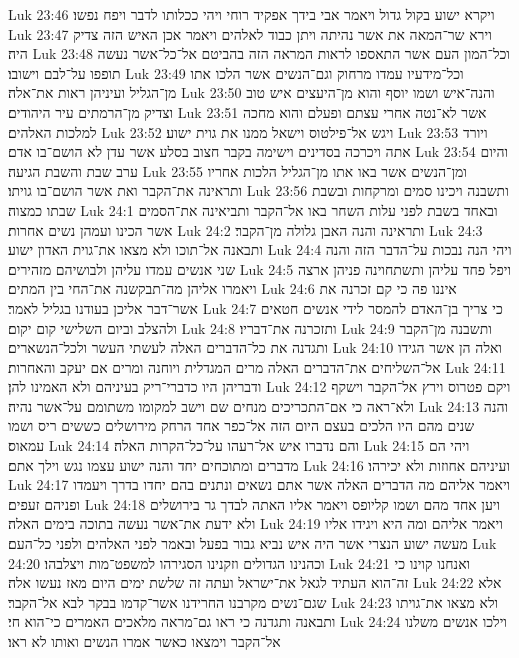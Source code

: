 Luk 23:46  ויקרא ישוע בקול גדול ויאמר אבי בידך אפקיד רוחי ויהי ככלותו לדבר ויפח נפשו׃
Luk 23:47  וירא שר־המאה את אשר נהיתה ויתן כבוד לאלהים ויאמר אכן האיש הזה צדיק היה׃
Luk 23:48  וכל־המון העם אשר התאספו לראות המראה הזה בהביטם אל־כל־אשר נעשה תופפו על־לבם וישובו׃
Luk 23:49  וכל־מידעיו עמדו מרחוק וגם־הנשים אשר הלכו אתו מן־הגליל ועיניהן ראות את־אלה׃
Luk 23:50  והנה־איש ושמו יוסף והוא מן־היעצים איש טוב וצדיק מן־הרמתים עיר היהודים׃
Luk 23:51  אשר לא־נטה אחרי עצתם ופעלם והוא מחכה למלכות האלהים׃
Luk 23:52  ויגש אל־פילטוס וישאל ממנו את גוית ישוע׃
Luk 23:53  ויורד אתה ויכרכה בסדינים וישימה בקבר חצוב בסלע אשר עדן לא הושם־בו אדם׃
Luk 23:54  והיום ערב שבת והשבת הגיעה׃
Luk 23:55  ומן־הנשים אשר באו אתו מן־הגליל הלכות אחריו ותראינה את־הקבר ואת אשר הושם־בו גויתו׃
Luk 23:56  ותשבנה ויכינו סמים ומרקחות ובשבת שבתו כמצוה׃
Luk 24:1  ובאחד בשבת לפני עלות השחר באו אל־הקבר ותביאינה את־הסמים אשר הכינו ועמהן נשים אחרות׃
Luk 24:2  ותראינה והנה האבן גלולה מן־הקבר׃
Luk 24:3  ותבאנה אל־תוכו ולא מצאו את־גוית האדון ישוע׃
Luk 24:4  ויהי הנה נבכות על־הדבר הזה והנה שני אנשים עמדו עליהן ולבושיהם מזהירים׃
Luk 24:5  ויפל פחד עליהן ותשתחוינה פניהן ארצה ויאמרו אליהן מה־תבקשנה את־החי בין המתים׃
Luk 24:6  איננו פה כי קם זכרנה את אשר־דבר אליכן בעודנו בגליל לאמר׃
Luk 24:7  כי צריך בן־האדם להמסר לידי אנשים חטאים ולהצלב וביום השלישי קום יקום׃
Luk 24:8  ותזכרנה את־דבריו׃
Luk 24:9  ותשבנה מן־הקבר ותגדנה את כל־הדברים האלה לעשתי העשר ולכל־הנשארים׃
Luk 24:10  ואלה הן אשר הגידו אל־השליחים את־הדברים האלה מרים המגדלית ויוחנה ומרים אם יעקב והאחרות׃
Luk 24:11  ודבריהן היו כדברי־ריק בעיניהם ולא האמינו להן׃
Luk 24:12  ויקם פטרוס וירץ אל־הקבר וישקף ולא־ראה כי אם־התכריכים מנחים שם וישב למקומו משתומם על־אשר נהיה׃
Luk 24:13  והנה שנים מהם היו הלכים בעצם היום הזה אל־כפר אחד הרחק מירושלים כששים ריס ושמו עמאוס׃
Luk 24:14  והם נדברו איש אל־רעהו על־כל־הקרות האלה׃
Luk 24:15  ויהי הם מדברים ומתוכחים יחד והנה ישוע עצמו נגש וילך אתם׃
Luk 24:16  ועיניהם אחוזות ולא יכירהו׃
Luk 24:17  ויאמר אליהם מה הדברים האלה אשר אתם נשאים ונתנים בהם יחדו בדרך ויעמדו ופניהם זעפים׃
Luk 24:18  ויען אחד מהם ושמו קליופס ויאמר אליו האתה לבדך גר בירושלים ולא ידעת את־אשר נעשה בתוכה בימים האלה׃
Luk 24:19  ויאמר אליהם ומה היא ויגידו אליו מעשה ישוע הנצרי אשר היה איש נביא גבור בפעל ובאמר לפני האלהים ולפני כל־העם׃
Luk 24:20  וכהנינו הגדולים וזקנינו הסגירהו למשפט־מות ויצלבהו׃
Luk 24:21  ואנחנו קוינו כי זה־הוא העתיד לגאל את־ישראל ועתה זה שלשת ימים היום מאז נעשו אלה׃
Luk 24:22  אלא שגם־נשים מקרבנו החרידנו אשר־קדמו בבקר לבא אל־הקבר׃
Luk 24:23  ולא מצאו את־גויתו ותבאנה ותגדנה כי ראו גם־מראה מלאכים האמרים כי־הוא חי׃
Luk 24:24  וילכו אנשים משלנו אל־הקבר וימצאו כאשר אמרו הנשים ואותו לא ראו׃
